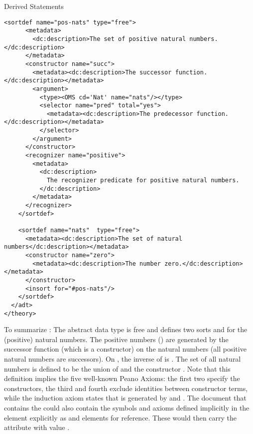 \begin{omgroup}{Derived Statements}
\begin{module}[id=adt]
\begin{omgroup}[id=adt,short=Abstract Data Types]
\begin{module}[id=adt]
\begin{lstlisting}[label=lst:nat-adt,
  caption={The natural numbers using \element{adt} in \omdoc},
  index={adt,sortdef,constructor,argument,selector,recognizer,insort}]
    <sortdef name="pos-nats" type="free">
      <metadata>
        <dc:description>The set of positive natural numbers.</dc:description>
      </metadata>
      <constructor name="succ">
        <metadata><dc:description>The successor function.</dc:description></metadata>
        <argument>
          <type><OMS cd='Nat' name="nats"/></type>
          <selector name="pred" total="yes">
            <metadata><dc:description>The predecessor function.</dc:description></metadata>
          </selector>
        </argument>
      </constructor>
      <recognizer name="positive">
        <metadata>
          <dc:description>
            The recognizer predicate for positive natural numbers.
          </dc:description>
        </metadata>
      </recognizer>
    </sortdef>

    <sortdef name="nats"  type="free">
      <metadata><dc:description>The set of natural numbers</dc:description></metadata>
      <constructor name="zero">
        <metadata><dc:description>The number zero.</dc:description></metadata>
      </constructor>
      <insort for="#pos-nats"/>
    </sortdef>
  </adt>
</theory>
\end{lstlisting}
To summarize {}: The abstract data type {} is free and
defines two sorts {} and {} for the (positive) natural
numbers. The positive numbers ({}) are generated by the successor
function (which is a constructor) on the natural numbers (all positive natural numbers are
successors). On {}, the inverse {} of {} is
{}.  The set {} of all natural numbers is defined to be the
union of {} and the constructor {}.  Note that this
definition implies the five well-known Peano Axioms: the first two specify the
constructors, the third and fourth exclude identities between constructor terms, while the
induction axiom states that {} is generated by {} and
{}.  The document that contains the {} could also contain
the symbols and axioms defined implicitly in the  element explicitly as
 and  elements for reference.  These would then carry
the  attribute with value
{}.
\end{module}
\end{omgroup}
\end{module}


\end{omgroup}
